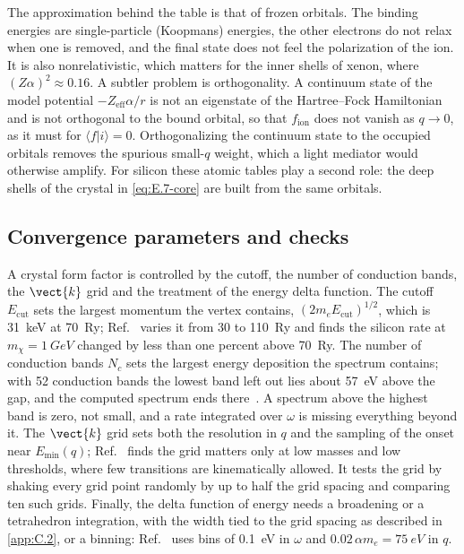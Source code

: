 The approximation behind the table is that of frozen orbitals. The binding energies are single-particle (Koopmans) energies, the other electrons do not relax when one is removed, and the final state does not feel the polarization of the ion. It is also nonrelativistic, which matters for the inner shells of xenon, where $(Z\alpha)^2 \approx 0.16$. A subtler problem is orthogonality. A continuum state of the model potential $-Z_{\mathrm{eff}}\alpha/r$ is not an eigenstate of the Hartree--Fock Hamiltonian and is not orthogonal to the bound orbital, so that $f_{\mathrm{ion}}$ does not vanish as $q \to 0$, as it must for $\langle f|i\rangle = 0$. Orthogonalizing the continuum state to the occupied orbitals removes the spurious small-$q$ weight, which a light mediator would otherwise amplify. For silicon these atomic tables play a second role: the deep shells of the crystal in \cref{eq:E.7-core} are built from the same orbitals.

\subsection{Convergence parameters and checks}

A crystal form factor is controlled by the cutoff, the number of conduction bands, the $\vect{k}$ grid and the treatment of the energy delta function. The cutoff $E_{\mathrm{cut}}$ sets the largest momentum the vertex contains, $(2m_eE_{\mathrm{cut}})^{1/2}$, which is \SI{31}{keV} at \SI{70}{Ry}; Ref.~\cite[Appendix~C]{essig2016direct} varies it from 30 to \SI{110}{Ry} and finds the silicon rate at $m_\chi = \SI{1}{GeV}$ changed by less than one percent above \SI{70}{Ry}. The number of conduction bands $N_c$ sets the largest energy deposition the spectrum contains; with 52 conduction bands the lowest band left out lies about \SI{57}{eV} above the gap, and the computed spectrum ends there~\cite[Sect.~4.2]{essig2016direct}. A spectrum above the highest band is zero, not small, and a rate integrated over $\omega$ is missing everything beyond it. The $\vect{k}$ grid sets both the resolution in $q$ and the sampling of the onset near $E_{\mathrm{min}}(q)$; Ref.~\cite[Appendix~C]{essig2016direct} finds the grid matters only at low masses and low thresholds, where few transitions are kinematically allowed. It tests the grid by shaking every grid point randomly by up to half the grid spacing and comparing ten such grids. Finally, the delta function of energy needs a broadening or a tetrahedron integration, with the width tied to the grid spacing as described in \cref{app:C.2}, or a binning: Ref.~\cite[Sect.~4.2]{essig2016direct} uses bins of \SI{0.1}{eV} in $\omega$ and $0.02\,\alpha m_e = \SI{75}{eV}$ in $q$.

